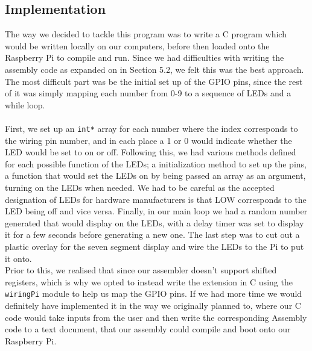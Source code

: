 \documentclass[11pt,twoside]{article}
\begin{document}
\subsection{Implementation}
The way we decided to tackle this program was to write a C program which would be written locally on our computers, before then loaded onto the Raspberry Pi to compile and run. Since we had difficulties with writing the assembly code as expanded on in Section 5.2, we felt this was the best approach. The most difficult part was be the initial set up of the GPIO pins, since the rest of it was simply mapping each number from 0-9 to a sequence of LEDs and a while loop.\\\\
First, we set up an \texttt{int*} array for each number where the index corresponds to the wiring pin number, and in each place a 1 or 0 would indicate whether the LED would be set to on or off. Following this, we had various methods defined for each possible function of the LEDs; a initialization method to set up the pins, a function that would set the LEDs on by being passed an array as an argument, turning on the LEDs when needed. We had to be careful as the accepted designation of LEDs for hardware manufacturers is that LOW corresponds to the LED being off and vice versa. Finally, in our main loop we had a random number generated that would display on the LEDs, with a delay timer was set to display it for a few seconds before generating a new one. The last step was to cut out a plastic overlay for the seven segment display and wire the LEDs to the Pi to put it onto.\\

Prior to this, we realised that since our assembler doesn't support shifted registers, which is why we opted to instead write the extension in C using the \texttt{wiringPi} module to help us map the GPIO pins. If we had more time we would definitely have implemented it in the way we originally planned to, where our C code would take inputs from the user and then write the corresponding Assembly code to a text document, that our assembly could compile and boot onto our Raspberry Pi.\\
\end{document}

